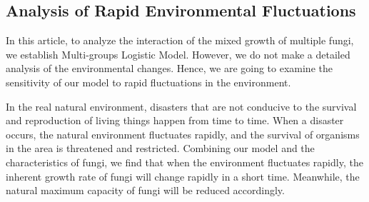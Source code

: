 \subsection{Analysis of Rapid Environmental Fluctuations}
In this article, to analyze the interaction of the mixed growth of multiple fungi, we establish Multi-groups Logistic Model. However, we do not make a detailed analysis of the environmental changes. Hence, we are going to examine the sensitivity of our model to rapid fluctuations in the environment.
\par
In the real natural environment, disasters that are not conducive to the survival and reproduction of living things happen from time to time. When a disaster occurs, the natural environment fluctuates rapidly, and the survival of organisms in the area is threatened and restricted. Combining our model and the characteristics of fungi, we find that when the environment fluctuates rapidly, the inherent growth rate of fungi will change rapidly in a short time. Meanwhile, the natural maximum capacity of fungi will be reduced accordingly.